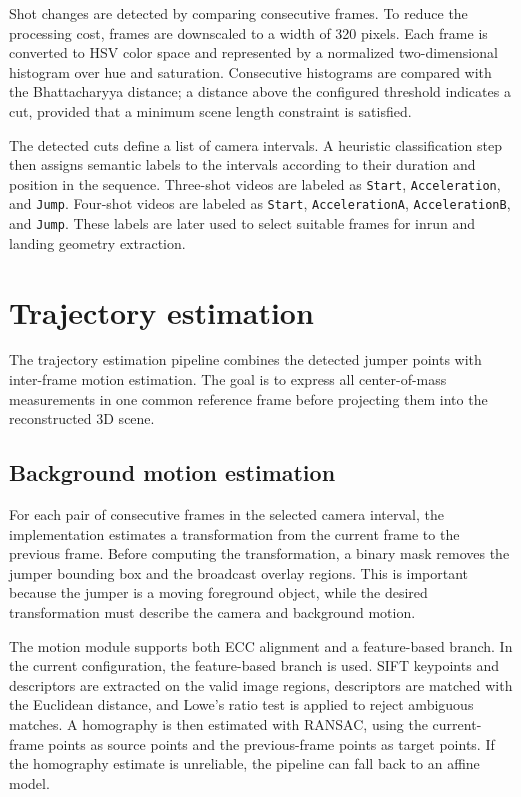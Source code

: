 Shot changes are detected by comparing consecutive frames. To reduce the processing cost, frames are downscaled to a width of 320 pixels. Each frame is converted to HSV color space and represented by a normalized two-dimensional histogram over hue and saturation. Consecutive histograms are compared with the Bhattacharyya distance; a distance above the configured threshold indicates a cut, provided that a minimum scene length constraint is satisfied.

The detected cuts define a list of camera intervals. A heuristic classification step then assigns semantic labels to the intervals according to their duration and position in the sequence. Three-shot videos are labeled as \texttt{Start}, \texttt{Acceleration}, and \texttt{Jump}. Four-shot videos are labeled as \texttt{Start}, \texttt{AccelerationA}, \texttt{AccelerationB}, and \texttt{Jump}. These labels are later used to select suitable frames for inrun and landing geometry extraction.

\section{Trajectory estimation}
The trajectory estimation pipeline combines the detected jumper points with inter-frame motion estimation. The goal is to express all center-of-mass measurements in one common reference frame before projecting them into the reconstructed 3D scene.

\subsection{Background motion estimation}
For each pair of consecutive frames in the selected camera interval, the implementation estimates a transformation from the current frame to the previous frame. Before computing the transformation, a binary mask removes the jumper bounding box and the broadcast overlay regions. This is important because the jumper is a moving foreground object, while the desired transformation must describe the camera and background motion.

The motion module supports both ECC alignment and a feature-based branch. In the current configuration, the feature-based branch is used. SIFT keypoints and descriptors are extracted on the valid image regions, descriptors are matched with the Euclidean distance, and Lowe's ratio test is applied to reject ambiguous matches. A homography is then estimated with RANSAC, using the current-frame points as source points and the previous-frame points as target points. If the homography estimate is unreliable, the pipeline can fall back to an affine model.


